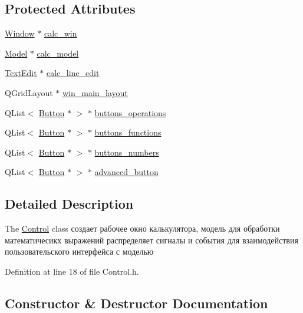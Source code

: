 \subsection*{Protected Attributes}
\begin{DoxyCompactItemize}
\item 
\hyperlink{classWindow}{Window} $\ast$ \hyperlink{classControl_a377fd2daac62819ac5856cc2a852c550}{calc\+\_\+win}
\item 
\hyperlink{classModel}{Model} $\ast$ \hyperlink{classControl_a249421d8ef527bd40991b557daec911c}{calc\+\_\+model}
\item 
\hyperlink{classTextEdit}{Text\+Edit} $\ast$ \hyperlink{classControl_ae666eb91a7f9f964a07e779798cd18c8}{calc\+\_\+line\+\_\+edit}
\item 
Q\+Grid\+Layout $\ast$ \hyperlink{classControl_ab3a44edbe7c336f435e0d0e8d2258e0d}{win\+\_\+main\+\_\+layout}
\item 
Q\+List$<$ \hyperlink{classButton}{Button} $\ast$ $>$ $\ast$ \hyperlink{classControl_adc925de7c9359450654d0ebf03304a07}{buttons\+\_\+operations}
\item 
Q\+List$<$ \hyperlink{classButton}{Button} $\ast$ $>$ $\ast$ \hyperlink{classControl_ada5bc6208e19fb16e73c0000164db11a}{buttons\+\_\+functions}
\item 
Q\+List$<$ \hyperlink{classButton}{Button} $\ast$ $>$ $\ast$ \hyperlink{classControl_a1675f42401d90e37e0273f991c6886b6}{buttons\+\_\+numbers}
\item 
Q\+List$<$ \hyperlink{classButton}{Button} $\ast$ $>$ $\ast$ \hyperlink{classControl_a411ed3a73de2c83535ce4d2b44b91ace}{advanced\+\_\+button}
\end{DoxyCompactItemize}


\subsection{Detailed Description}
The \hyperlink{classControl}{Control} class создает рабочее окно калькулятора, модель для обработки математичесикх выражений распределяет сигналы и события для взаимодействия пользовательского интерфейса с моделью 

Definition at line 18 of file Control.\+h.



\subsection{Constructor \& Destructor Documentation}
\hypertarget{classControl_a871ce0e5519b1b67b9d785accddee746}{}
